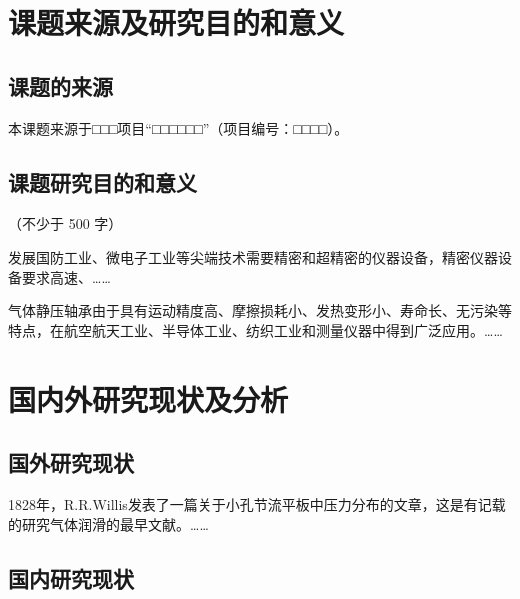 
\section{课题来源及研究目的和意义}

\subsection{课题的来源}

本课题来源于□□□项目“□□□□□□”（项目编号：□□□□）。

\subsection{课题研究目的和意义}

（不少于 500 字）

发展国防工业、微电子工业等尖端技术需要精密和超精密的仪器设备，精密仪器设备要求高速、……

气体静压轴承由于具有运动精度高、摩擦损耗小、发热变形小、寿命长、无污染等特点，在航空航天工业、半导体工业、纺织工业和测量仪器中得到广泛应用。……

\section{国内外研究现状及分析}

\subsection{国外研究现状}

1828年，R.R.Willis\cite{zhao1998}发表了一篇关于小孔节流平板中压力分布的文章，这是有记载的研究气体润滑的最早文献。……

\subsection{国内研究现状}

